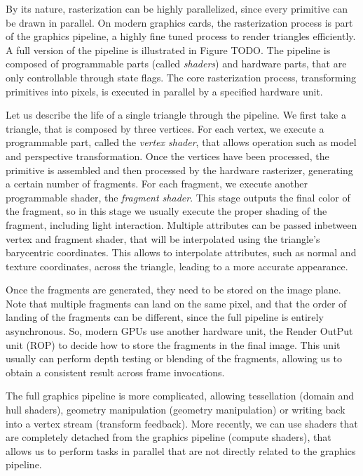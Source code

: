 By its nature, rasterization can be highly parallelized, since every primitive can be drawn in parallel. On modern graphics cards, the rasterization process is part of the graphics pipeline, a highly fine tuned process to render triangles efficiently. A full version of the pipeline is illustrated in Figure TODO. The pipeline is composed of programmable parts (called \emph{shaders}) and hardware parts, that are only controllable through state flags. The core rasterization process, transforming primitives into pixels, is executed in parallel by a specified hardware unit. 

Let us describe the life of a single triangle through the pipeline. We first take a triangle, that is composed by three vertices. For each vertex, we execute a programmable part, called the \emph{vertex shader}, that allows operation such as model and perspective transformation. Once the vertices have been processed, the primitive is assembled and then processed by the hardware rasterizer, generating a certain number of fragments. For each fragment, we execute another programmable shader, the \emph{fragment shader}. This stage outputs the final color of the fragment, so in this stage we usually execute the proper shading of the fragment, including light interaction. Multiple attributes can be passed inbetween vertex and fragment shader, that will be interpolated using the triangle's barycentric coordinates. This allows to interpolate attributes, such as normal and texture coordinates, across the triangle, leading to a more accurate appearance. 

Once the fragments are generated, they need to be stored on the image plane. Note that multiple fragments can land on the same pixel, and that the order of landing of the fragments can be different, since the full pipeline is entirely asynchronous. So, modern GPUs use another hardware unit, the Render OutPut unit (ROP) to decide how to store the fragments in the final image. This unit usually can perform depth testing or blending of the fragments, allowing us to obtain a consistent result across frame invocations.

The full graphics pipeline is more complicated, allowing tessellation (domain and hull shaders), geometry manipulation (geometry manipulation) or writing back into a vertex stream (transform feedback). More recently, we can use shaders that are completely detached from the graphics pipeline (compute shaders), that allows us to perform tasks in parallel that are not directly related to the graphics pipeline. 

